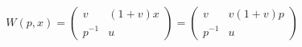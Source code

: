 \begin{equation}
W(p,x)= \left(
\begin{array}{cc}
v & (1+v)x \\
p^{-1} & u
\end{array} \right)=\left(
\begin{array}{cc}
v & v(1+v)p \\
p^{-1} & u
\end{array} 
\right)
\end{equation}

